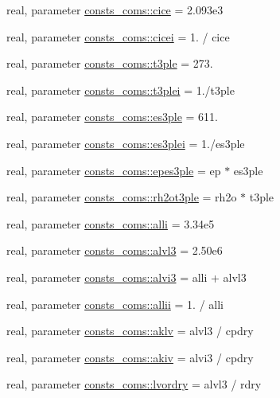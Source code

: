 \begin{DoxyCompactItemize}
\item 
real, parameter \hyperlink{namespaceconsts__coms_ae49393979194289765ba196f2ac2e000}{consts\+\_\+coms\+::cice} = 2.\+093e3
\item 
real, parameter \hyperlink{namespaceconsts__coms_a090b60028f7eece2f3e31fdafb782241}{consts\+\_\+coms\+::cicei} = 1. / cice
\item 
real, parameter \hyperlink{namespaceconsts__coms_aed2b23708875a89de5f372ecc4299dd4}{consts\+\_\+coms\+::t3ple} = 273.
\item 
real, parameter \hyperlink{namespaceconsts__coms_a091ec81cfeedd9148a6f44471936ab4f}{consts\+\_\+coms\+::t3plei} = 1./t3ple
\item 
real, parameter \hyperlink{namespaceconsts__coms_acce85d2ba9f93e18b505d97bffd4a453}{consts\+\_\+coms\+::es3ple} = 611.
\item 
real, parameter \hyperlink{namespaceconsts__coms_ae5b40232ff74fe2d9258b854fe070dc6}{consts\+\_\+coms\+::es3plei} = 1./es3ple
\item 
real, parameter \hyperlink{namespaceconsts__coms_a12ac1017d17262aa7e40fa9a325273b9}{consts\+\_\+coms\+::epes3ple} = ep $\ast$ es3ple
\item 
real, parameter \hyperlink{namespaceconsts__coms_a59fef76536ae1c8cf0ed4067acdcebf4}{consts\+\_\+coms\+::rh2ot3ple} = rh2o $\ast$ t3ple
\item 
real, parameter \hyperlink{namespaceconsts__coms_aed7ce8242223a8b27f2052b3082e34d8}{consts\+\_\+coms\+::alli} = 3.\+34e5
\item 
real, parameter \hyperlink{namespaceconsts__coms_a8458ca23e2c2f0ef6580474773afd4e8}{consts\+\_\+coms\+::alvl3} = 2.\+50e6
\item 
real, parameter \hyperlink{namespaceconsts__coms_aa133e21cddffbe4c7673ae73771a15bb}{consts\+\_\+coms\+::alvi3} = alli + alvl3
\item 
real, parameter \hyperlink{namespaceconsts__coms_a4fd9b42d0269a2878dee9276cab091c5}{consts\+\_\+coms\+::allii} = 1. / alli
\item 
real, parameter \hyperlink{namespaceconsts__coms_a5f00cfbd5e6d86aeaafaddbda45f58d0}{consts\+\_\+coms\+::aklv} = alvl3 / cpdry
\item 
real, parameter \hyperlink{namespaceconsts__coms_a59810df1b5b54dbe510de801eb433951}{consts\+\_\+coms\+::akiv} = alvi3 / cpdry
\item 
real, parameter \hyperlink{namespaceconsts__coms_ae611b04973a1008f366e8060a2a88777}{consts\+\_\+coms\+::lvordry} = alvl3 / rdry
\item 

\end{DoxyCompactItemize}
